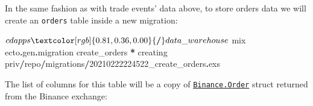 \documentclass[
  oneside]{book}
\newenvironment{Shaded}{\begin{snugshade}}{\end{snugshade}}
\newcommand{\DecValTok}[1]{\textcolor[rgb]{0.00,0.00,0.81}{#1}}
\newcommand{\NormalTok}[1]{#1}
\newcommand{\OperatorTok}[1]{\textcolor[rgb]{0.81,0.36,0.00}{\textbf{#1}}}
\begin{document}
In the same fashion as with trade events' data above, to store orders data we will create an \texttt{orders} table inside a new migration:

\begin{Shaded}
\begin{Highlighting}[]
\NormalTok{$ cd apps}\OperatorTok{/}\NormalTok{data\_warehouse}
\NormalTok{$ mix ecto}\OperatorTok{.}\NormalTok{gen}\OperatorTok{.}\NormalTok{migration create\_orders}
\OperatorTok{*}\NormalTok{ creating priv}\OperatorTok{/}\NormalTok{repo}\OperatorTok{/}\NormalTok{migrations}\OperatorTok{/}\DecValTok{20210222224522}\NormalTok{\_create\_orders}\OperatorTok{.}\NormalTok{exs}
\end{Highlighting}
\end{Shaded}

The list of columns for this table will be a copy of \href{https://github.com/dvcrn/binance.ex/blob/master/lib/binance/order.ex}{\texttt{Binance.Order}} struct returned from the Binance exchange:
\end{document}

